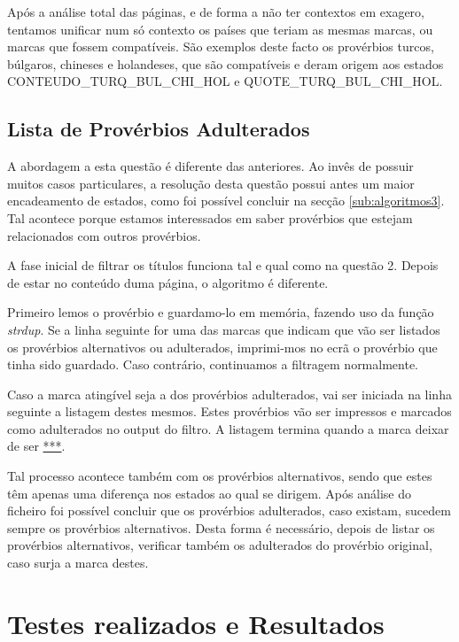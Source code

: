 \documentclass[11pt,a4paper]{report}
\begin{document}
Após a análise total das páginas, e de forma a não ter contextos em exagero, tentamos unificar num só contexto os países que teriam as mesmas marcas, ou marcas que fossem compatíveis. São exemplos deste facto os provérbios turcos, búlgaros, chineses e holandeses, que são compatíveis e deram origem aos estados CONTEUDO\_TURQ\_BUL\_CHI\_HOL e QUOTE\_TURQ\_BUL\_CHI\_HOL.


\newpage

\subsection{Lista de Provérbios Adulterados}

A abordagem a esta questão é diferente das anteriores. Ao invês de possuir muitos casos particulares, a resolução desta questão possui antes um maior encadeamento de estados, como foi possível concluir na secção \ref{sub:algoritmos3}. Tal acontece porque estamos interessados em saber provérbios que estejam relacionados com outros provérbios.

A fase inicial de filtrar os títulos funciona tal e qual como na questão 2. Depois de estar no conteúdo duma página, o algoritmo é diferente.

Primeiro lemos o provérbio e guardamo-lo em memória, fazendo uso da função \textit{strdup}. Se a linha seguinte for uma das marcas que indicam que vão ser listados os provérbios alternativos ou adulterados, imprimi-mos no ecrã o provérbio que tinha sido guardado. Caso contrário, continuamos a filtragem normalmente.

Caso a marca atingível seja a dos provérbios adulterados, vai ser iniciada na linha seguinte a listagem destes mesmos. Estes provérbios vão ser impressos e marcados como adulterados no output do filtro. A listagem termina quando a marca deixar de ser \underline{***}.

Tal processo acontece também com os provérbios alternativos, sendo que estes têm apenas uma diferença nos estados ao qual se dirigem. Após análise do ficheiro foi possível concluir que os provérbios adulterados, caso existam, sucedem sempre os provérbios alternativos. Desta forma é necessário, depois de listar os provérbios alternativos, verificar também os adulterados do provérbio original, caso surja a marca destes.



\section{Testes realizados e Resultados}
\end{document}
